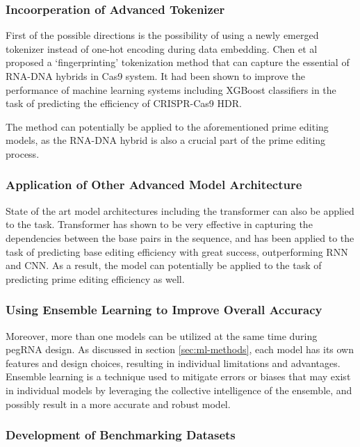 \documentclass[12pt]{article}
\begin{document}
\subsubsection{Incoorperation of Advanced Tokenizer}

First of the possible directions is the possibility of using a newly emerged tokenizer instead of one-hot encoding during data embedding. Chen et al proposed a `fingerprinting' tokenization method that can capture the essential of RNA-DNA hybrids in Cas9 system. It had been shown to improve the performance of machine learning systems including XGBoost classifiers in the task of predicting the efficiency of CRISPR-Cas9 HDR\cite{chenGenomewideCRISPROfftarget2023}. 

The method can potentially be applied to the aforementioned prime editing models, as the RNA-DNA hybrid is also a crucial part of the prime editing process. 

\subsubsection{Application of Other Advanced Model Architecture}

State of the art model architectures including the transformer can also be applied to the task. Transformer has shown to be very effective in capturing the dependencies between the base pairs in the sequence, and has been applied to the task of predicting base editing efficiency with great success, outperforming RNN and CNN\cite{marquartPredictingBaseEditing2021}. As a result, the model can potentially be applied to the task of predicting prime editing efficiency as well. 

\subsubsection{Using Ensemble Learning to Improve Overall Accuracy}

Moreover, more than one models can be utilized at the same time during pegRNA design. As discussed in section \ref{sec:ml-methods}, each model has its own features and design choices, resulting in individual limitations and advantages. Ensemble learning is a technique used to mitigate errors or biases that may exist in individual models by leveraging the collective intelligence of the ensemble, and possibly result in a more accurate and robust model.

\subsubsection{Development of Benchmarking Datasets}
\end{document}

